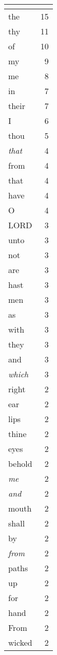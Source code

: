 \begin{center}
\begin{longtable}{l|r}
\hline \multicolumn{2}{c}{{ }} \\ \hline
\endfoot 
the & 15\\ \hline 
thy & 11\\ \hline 
of & 10\\ \hline 
my & 9\\ \hline 
me & 8\\ \hline 
in & 7\\ \hline 
their & 7\\ \hline 
I & 6\\ \hline 
thou & 5\\ \hline 
\emph{that} & 4\\ \hline 
from & 4\\ \hline 
that & 4\\ \hline 
have & 4\\ \hline 
O & 4\\ \hline 
LORD & 3\\ \hline 
unto & 3\\ \hline 
not & 3\\ \hline 
are & 3\\ \hline 
hast & 3\\ \hline 
men & 3\\ \hline 
as & 3\\ \hline 
with & 3\\ \hline 
they & 3\\ \hline 
and & 3\\ \hline 
\emph{which} & 3\\ \hline 
right & 2\\ \hline 
ear & 2\\ \hline 
lips & 2\\ \hline 
thine & 2\\ \hline 
eyes & 2\\ \hline 
behold & 2\\ \hline 
\emph{me} & 2\\ \hline 
\emph{and} & 2\\ \hline 
mouth & 2\\ \hline 
shall & 2\\ \hline 
by & 2\\ \hline 
\emph{from} & 2\\ \hline 
paths & 2\\ \hline 
up & 2\\ \hline 
for & 2\\ \hline 
hand & 2\\ \hline 
From & 2\\ \hline 
wicked & 2\\ \hline 

\end{longtable}
\end{center}
